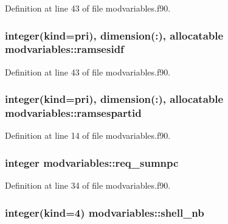 Definition at line 43 of file modvariables.\+f90.

\subsubsection[{\texorpdfstring{ramsesidf}{ramsesidf}}]{\setlength{\rightskip}{0pt plus 5cm}integer(kind={\bf pri}), dimension(\+:), allocatable modvariables\+::ramsesidf}\hypertarget{namespacemodvariables_a960cf3d5497024438caba54185cd7793}{}\label{namespacemodvariables_a960cf3d5497024438caba54185cd7793}


Definition at line 43 of file modvariables.\+f90.

\subsubsection[{\texorpdfstring{ramsespartid}{ramsespartid}}]{\setlength{\rightskip}{0pt plus 5cm}integer(kind={\bf pri}), dimension(\+:), allocatable modvariables\+::ramsespartid}\hypertarget{namespacemodvariables_aad55ee2cd6f458e86f0f8fa31339fac1}{}\label{namespacemodvariables_aad55ee2cd6f458e86f0f8fa31339fac1}


Definition at line 14 of file modvariables.\+f90.

\subsubsection[{\texorpdfstring{req\+\_\+sumnpc}{req_sumnpc}}]{\setlength{\rightskip}{0pt plus 5cm}integer modvariables\+::req\+\_\+sumnpc}\hypertarget{namespacemodvariables_a64644f9282a9c19faf8ccb44b0e60877}{}\label{namespacemodvariables_a64644f9282a9c19faf8ccb44b0e60877}


Definition at line 34 of file modvariables.\+f90.

\subsubsection[{\texorpdfstring{shell\+\_\+nb}{shell_nb}}]{\setlength{\rightskip}{0pt plus 5cm}integer(kind=4) modvariables\+::shell\+\_\+nb}\hypertarget{namespacemodvariables_a8e749d6e70dade5cb6d75a09a99cefd7}{}\label{namespacemodvariables_a8e749d6e70dade5cb6d75a09a99cefd7}


